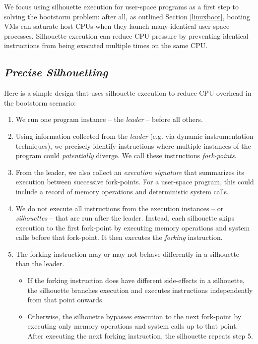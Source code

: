 We focus using silhouette execution for user-space programs as 
a first step to solving the bootstorm problem: after all, as outlined
Section \ref{linuxboot}, booting VMs
can saturate host CPUs when they launch many
identical user-space processes. Silhouette
execution can reduce
CPU pressure by preventing
identical instructions from being
executed multiple times on the same CPU.

\subsection{{\em Precise Silhouetting}}\label{precise:sil}
Here is a simple design that uses silhouette execution 
to reduce CPU overhead in the bootstorm scenario: 

\begin{enumerate}

\item We run one program instance -- the {\em leader} -- before 
all others.

\item Using information collected from the {\em leader} (e.g.
via dynamic instrumentation techniques), 
we precisely identify instructions where
multiple instances of the program could {\em potentially} diverge.
We call these instructions {\em fork-points}.

\item From the leader, we also collect an {\em execution signature} 
that summarizes its execution between successive
fork-points. For a user-space program, this could
include a record of memory operations and 
deterministic system calls.

\item We do not execute all instructions from the execution
instances -- or {\em silhouettes} -- that are run
after the leader. Instead, each silhouette skips execution to
the first fork-point by executing memory
operations and system calls before that fork-point. 
It then executes the {\em forking} instruction.

\item The forking instruction may or 
may not behave differently
in a silhouette than the leader.

\begin{itemize}
\item If the forking instruction
does have different side-effects
in a silhouette, the silhouette branches execution and 
executes instructions independently
from that point onwards. 

\item Otherwise, the silhouette bypasses
execution to the next fork-point by
executing only memory operations and
system calls up to that point.
After executing the next forking instruction,
the silhouette repeats step 5.

\end{itemize}
\end{enumerate}

